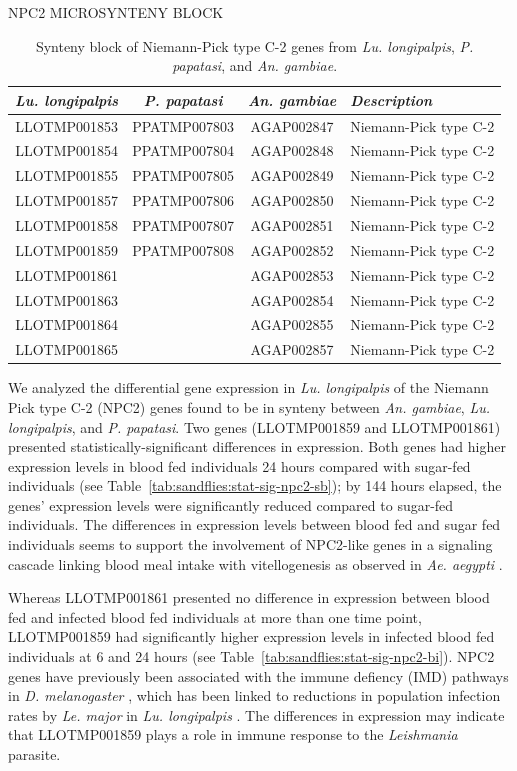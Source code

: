 \begin{table}[H]
  \centering
  \caption{NPC2 MICROSYNTENY BLOCK}
  \begin{tabular}{c c c l} \hline
    \emph{Lu. longipalpis} & \emph{P. papatasi} & \emph{An. gambiae} & \emph{Description} \\ \hline
    LLOTMP001853 & PPATMP007803 & AGAP002847 & Niemann-Pick type C-2 \\
    LLOTMP001854 & PPATMP007804 & AGAP002848 & Niemann-Pick type C-2 \\
    LLOTMP001855 & PPATMP007805 & AGAP002849 & Niemann-Pick type C-2 \\
    LLOTMP001857 & PPATMP007806 & AGAP002850 & Niemann-Pick type C-2 \\
    LLOTMP001858 & PPATMP007807 & AGAP002851 & Niemann-Pick type C-2 \\
    LLOTMP001859 & PPATMP007808 & AGAP002852 & Niemann-Pick type C-2 \\
    LLOTMP001861 & & AGAP002853 & Niemann-Pick type C-2 \\
    LLOTMP001863 & & AGAP002854 & Niemann-Pick type C-2 \\
    LLOTMP001864 & & AGAP002855 & Niemann-Pick type C-2 \\
    LLOTMP001865 & & AGAP002857 & Niemann-Pick type C-2
    \end{tabular}
    \caption*{Synteny block of Niemann-Pick type C-2 genes from \emph{Lu. longipalpis}, \emph{P. papatasi}, and \emph{An. gambiae}.}
  \label{tab:synteny-three-way-npc2}
\end{table}

We analyzed the differential gene expression in \emph{Lu. longipalpis} of the Niemann Pick type C-2 (NPC2) genes found to be in synteny between \emph{An. gambiae}, \emph{Lu. longipalpis}, and \emph{P. papatasi}.  Two genes (LLOTMP001859 and LLOTMP001861) presented statistically-significant differences in expression. Both genes had higher expression levels in blood fed individuals 24 hours compared with sugar-fed individuals (see Table~\ref{tab:sandflies:stat-sig-npc2-sb}); by 144 hours elapsed, the genes' expression levels were significantly reduced compared to sugar-fed individuals.  The differences in expression levels between blood fed and sugar fed individuals seems to support the involvement of NPC2-like genes in a signaling cascade linking blood meal intake with vitellogenesis as observed in \emph{Ae. aegypti} \cite{Sirot2011}.

Whereas LLOTMP001861 presented no difference in expression between blood fed and infected blood fed individuals at more than one time point, LLOTMP001859 had significantly higher expression levels in infected blood fed individuals at 6 and 24 hours (see Table~\ref{tab:sandflies:stat-sig-npc2-bi}). NPC2 genes have previously been associated with the immune defiency (IMD) pathways in \emph{D. melanogaster} \cite{Shi2012}, which has been linked to reductions in population infection rates by \emph{Le. major} in \emph{Lu. longipalpis} \cite{Telleria2012}. The differences in expression may indicate that LLOTMP001859 plays a role in immune response to the \emph{Leishmania} parasite.

